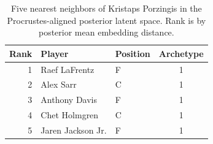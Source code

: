 \begin{table}[htbp]
  \centering\small
  \begin{tabular}{rllc}
    \toprule
    Rank & Player & Position & Archetype \\
    \midrule
    1 & Raef LaFrentz & F & 1 \\
    2 & Alex Sarr & C & 1 \\
    3 & Anthony Davis & F & 1 \\
    4 & Chet Holmgren & C & 1 \\
    5 & Jaren Jackson Jr. & F & 1 \\
    \bottomrule
  \end{tabular}
  \caption{Five nearest neighbors of Kristaps Porzingis in the Procrustes-aligned posterior latent space. Rank is by posterior mean embedding distance.}
  \label{tab:Kristaps_Porzingis_neighbors}
\end{table}


